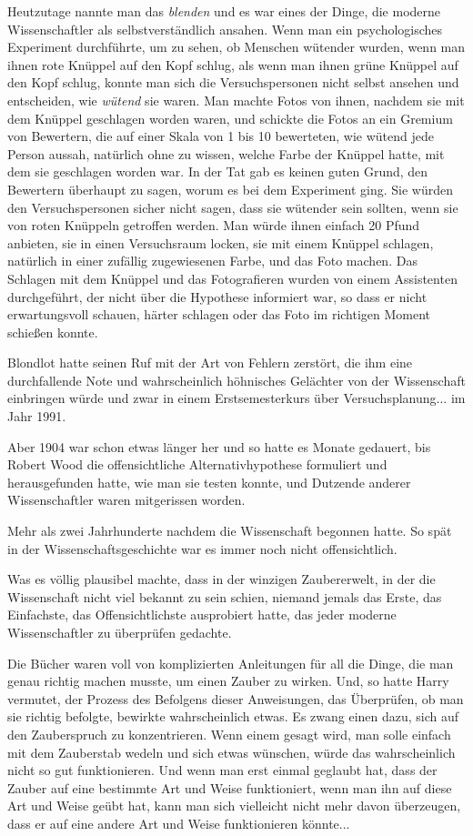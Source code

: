 Heutzutage nannte man das \glqq{}\emph{blenden}\grqq{} und es war eines der
Dinge, die moderne Wissenschaftler als selbstverständlich ansahen. Wenn man ein
psychologisches Experiment durchführte, um zu sehen, ob Menschen wütender
wurden, wenn man ihnen rote Knüppel auf den Kopf schlug, als wenn man ihnen
grüne Knüppel auf den Kopf schlug, konnte man sich die Versuchspersonen nicht
selbst ansehen und entscheiden, wie \glqq{}\emph{wütend}\grqq{} sie waren. Man
machte Fotos von ihnen, nachdem sie mit dem Knüppel geschlagen worden waren, und
schickte die Fotos an ein Gremium von Bewertern, die auf einer Skala von 1 bis
10 bewerteten, wie wütend jede Person aussah, natürlich ohne zu wissen, welche
Farbe der Knüppel hatte, mit dem sie geschlagen worden war. In der Tat gab es
keinen guten Grund, den Bewertern überhaupt zu sagen, worum es bei dem
Experiment ging. Sie würden den Versuchspersonen sicher nicht sagen, dass sie
wütender sein sollten, wenn sie von roten Knüppeln getroffen werden. Man würde
ihnen einfach 20 Pfund anbieten, sie in einen Versuchsraum locken, sie mit einem
Knüppel schlagen, natürlich in einer zufällig zugewiesenen Farbe, und das Foto
machen. Das Schlagen mit dem Knüppel und das Fotografieren wurden von einem
Assistenten durchgeführt, der nicht über die Hypothese informiert war, so dass
er nicht erwartungsvoll schauen, härter schlagen oder das Foto im richtigen
Moment schießen konnte.

Blondlot hatte seinen Ruf mit der Art von Fehlern zerstört, die ihm eine
durchfallende Note und wahrscheinlich höhnisches Gelächter von der Wissenschaft
einbringen würde und zwar in einem Erstsemesterkurs über Versuchsplanung... im
Jahr 1991.

Aber 1904 war schon etwas länger her und so hatte es Monate gedauert, bis Robert
Wood die offensichtliche Alternativhypothese formuliert und herausgefunden
hatte, wie man sie testen konnte, und Dutzende anderer Wissenschaftler waren
mitgerissen worden.

Mehr als zwei Jahrhunderte nachdem die Wissenschaft begonnen hatte. So spät in
der Wissenschaftsgeschichte war es immer noch nicht offensichtlich.

Was es völlig plausibel machte, dass in der winzigen Zaubererwelt, in der die
Wissenschaft nicht viel bekannt zu sein schien, niemand jemals das Erste, das
Einfachste, das Offensichtlichste ausprobiert hatte, das jeder moderne
Wissenschaftler zu überprüfen gedachte.

Die Bücher waren voll von komplizierten Anleitungen für all die Dinge, die man
genau richtig machen musste, um einen Zauber zu wirken. Und, so hatte Harry
vermutet, der Prozess des Befolgens dieser Anweisungen, das Überprüfen, ob man
sie richtig befolgte, bewirkte wahrscheinlich etwas. Es zwang einen dazu, sich
auf den Zauberspruch zu konzentrieren. Wenn einem gesagt wird, man solle einfach
mit dem Zauberstab wedeln und sich etwas wünschen, würde das wahrscheinlich
nicht so gut funktionieren. Und wenn man erst einmal geglaubt hat, dass der
Zauber auf eine bestimmte Art und Weise funktioniert, wenn man ihn auf diese Art
und Weise geübt hat, kann man sich vielleicht nicht mehr davon überzeugen, dass
er auf eine andere Art und Weise funktionieren könnte...

